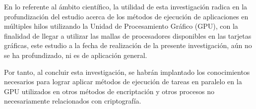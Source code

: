 \documentclass[../main.tex]{subfiles}
\begin{document}
  En lo referente al ámbito científico, la utilidad de esta investigación radica en la profundización del estudio acerca de los métodos de ejecución de aplicaciones en múltiples hilos utilizando la Unidad de Procesamiento Gráfico (GPU), con la finalidad de llegar a utilizar las mallas de procesadores disponibles en las tarjetas gráficas, este estudio a la fecha de realización de la presente investigación, aún no se ha profundizado, ni es de aplicación general.

  Por tanto, al concluir esta investigación, se habrán implantado los conocimientos necesarios para lograr aplicar métodos de ejecución de tareas en paralelo en la GPU utilizados en otros métodos de encriptación y otros procesos no necesariamente relacionados con criptografía.

  \bibliografia
\end{document}
